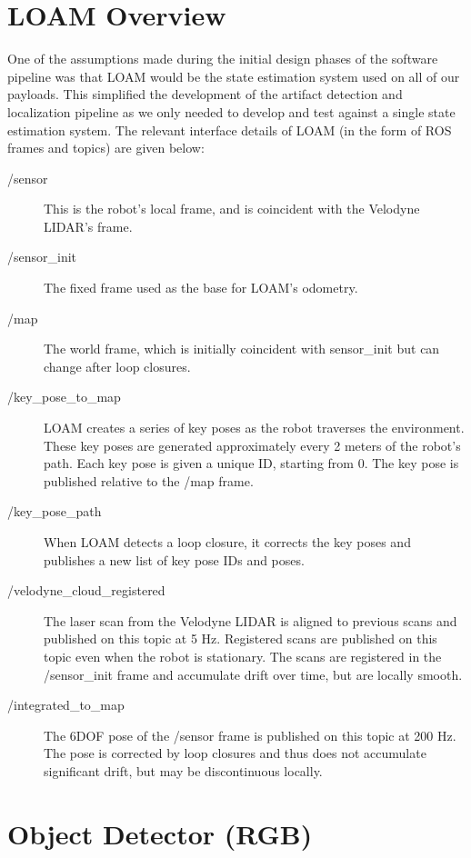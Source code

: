\section{LOAM Overview}

One of the assumptions made during the initial design phases of the software pipeline was that LOAM would be the state estimation system used on all of our payloads. This simplified the development of the artifact detection and localization pipeline as we only needed to develop and test against a single state estimation system. The relevant interface details of LOAM (in the form of ROS frames and topics) are given below:

\begin{description}
	\item[/sensor] This is the robot's local frame, and is coincident with the Velodyne LIDAR's frame.
	\item[/sensor\_init] The fixed frame used as the base for LOAM's odometry.
	\item[/map] The world frame, which is initially coincident with sensor\_init but can change after loop closures.
	\item[/key\_pose\_to\_map] LOAM creates a series of key poses as the robot traverses the environment. These key poses are generated approximately every 2 meters of the robot's path. Each key pose is given a unique ID, starting from 0. The key pose is published relative to the /map frame.
	\item[/key\_pose\_path] When LOAM detects a loop closure, it corrects the key poses and publishes a new list of key pose IDs and poses.
	\item[/velodyne\_cloud\_registered] The laser scan from the Velodyne LIDAR is aligned to previous scans and published on this topic at 5 Hz. Registered scans are published on this topic even when the robot is stationary. The scans are registered in the /sensor\_init frame and accumulate drift over time, but are locally smooth.
	\item[/integrated\_to\_map] The 6DOF pose of the /sensor frame is published on this topic at 200 Hz. The pose is corrected by loop closures and thus does not accumulate significant drift, but may be discontinuous locally.
\end{description}

\section{Object Detector (RGB)}


